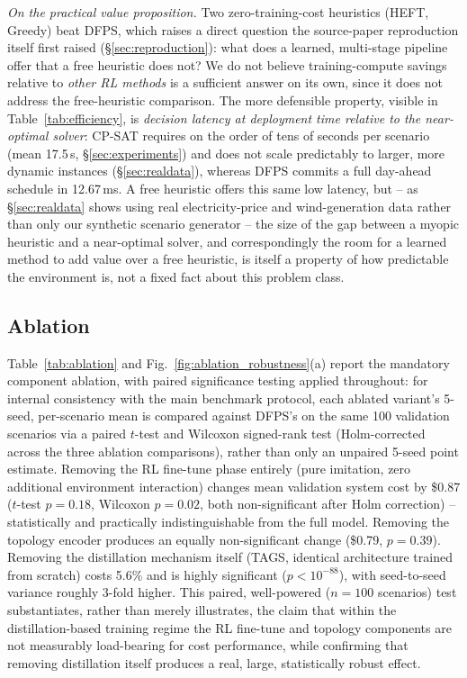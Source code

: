 \documentclass[journal]{IEEEtran}
\begin{document}
\textit{On the practical value proposition.} Two zero-training-cost heuristics (HEFT, Greedy) beat DFPS, which raises a direct question the source-paper reproduction itself first raised (\S\ref{sec:reproduction}): what does a learned, multi-stage pipeline offer that a free heuristic does not? We do not believe training-compute savings relative to \emph{other RL methods} is a sufficient answer on its own, since it does not address the free-heuristic comparison. The more defensible property, visible in Table~\ref{tab:efficiency}, is \emph{decision latency at deployment time relative to the near-optimal solver}: CP-SAT requires on the order of tens of seconds per scenario (mean 17.5\,s, \S\ref{sec:experiments}) and does not scale predictably to larger, more dynamic instances (\S\ref{sec:realdata}), whereas DFPS commits a full day-ahead schedule in 12.67\,ms. A free heuristic offers this same low latency, but -- as \S\ref{sec:realdata} shows using real electricity-price and wind-generation data rather than only our synthetic scenario generator -- the size of the gap between a myopic heuristic and a near-optimal solver, and correspondingly the room for a learned method to add value over a free heuristic, is itself a property of how predictable the environment is, not a fixed fact about this problem class.

\subsection{Ablation}
\label{sec:ablation}
Table~\ref{tab:ablation} and Fig.~\ref{fig:ablation_robustness}(a) report the mandatory component ablation, with paired significance testing applied throughout: for internal consistency with the main benchmark protocol, each ablated variant's 5-seed, per-scenario mean is compared against DFPS's on the same 100 validation scenarios via a paired $t$-test and Wilcoxon signed-rank test (Holm-corrected across the three ablation comparisons), rather than only an unpaired 5-seed point estimate. Removing the RL fine-tune phase entirely (pure imitation, zero additional environment interaction) changes mean validation system cost by \$0.87 ($t$-test $p=0.18$, Wilcoxon $p=0.02$, both non-significant after Holm correction) -- statistically and practically indistinguishable from the full model. Removing the topology encoder produces an equally non-significant change (\$0.79, $p=0.39$). Removing the distillation mechanism itself (TAGS, identical architecture trained from scratch) costs 5.6\% and is highly significant ($p<10^{-88}$), with seed-to-seed variance roughly 3-fold higher. This paired, well-powered ($n=100$ scenarios) test substantiates, rather than merely illustrates, the claim that within the distillation-based training regime the RL fine-tune and topology components are not measurably load-bearing for cost performance, while confirming that removing distillation itself produces a real, large, statistically robust effect.
\end{document}
